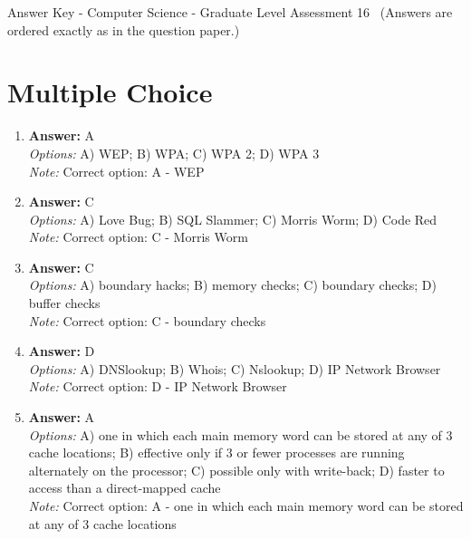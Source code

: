 \documentclass[12pt]{article}
\begin{document}
\begin{center}
Answer Key - Computer Science - Graduate Level Assessment 16 \
\small (Answers are ordered exactly as in the question paper.)
\end{center}

\section*{Multiple Choice}
\begin{enumerate}[label=\arabic*.]
\item \textbf{Answer:} A
\\ \textit{Options:} A) WEP; B) WPA; C) WPA 2; D) WPA 3
\\ \textit{Note:} Correct option: A - WEP
\item \textbf{Answer:} C
\\ \textit{Options:} A) Love Bug; B) SQL Slammer; C) Morris Worm; D) Code Red
\\ \textit{Note:} Correct option: C - Morris Worm
\item \textbf{Answer:} C
\\ \textit{Options:} A) boundary hacks; B) memory checks; C) boundary checks; D) buffer checks
\\ \textit{Note:} Correct option: C - boundary checks
\item \textbf{Answer:} D
\\ \textit{Options:} A) DNSlookup; B) Whois; C) Nslookup; D) IP Network Browser
\\ \textit{Note:} Correct option: D - IP Network Browser
\item \textbf{Answer:} A
\\ \textit{Options:} A) one in which each main memory word can be stored at any of 3 cache locations; B) effective only if 3 or fewer processes are running alternately on the processor; C) possible only with write-back; D) faster to access than a direct-mapped cache
\\ \textit{Note:} Correct option: A - one in which each main memory word can be stored at any of 3 cache locations
\end{enumerate}
\end{document}
